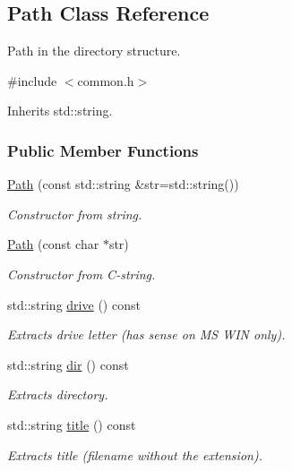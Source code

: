 \hypertarget{classPath}{
\subsection{Path Class Reference}
\label{classPath}
}


Path in the directory structure.  




{\ttfamily \#include $<$common.h$>$}



Inherits std::string.

\subsubsection*{Public Member Functions}
\begin{DoxyCompactItemize}
\item 
\hyperlink{classPath_ad74027d0529d7dc86303fa6dbee897ed}{Path} (const std::string \&str=std::string())
\begin{DoxyCompactList}\small\item\em Constructor from string. \item\end{DoxyCompactList}\item 
\hyperlink{classPath_a21dd91a2ef28ac356b59b5be122fb664}{Path} (const char $\ast$str)
\begin{DoxyCompactList}\small\item\em Constructor from C-\/string. \item\end{DoxyCompactList}\item 
std::string \hyperlink{classPath_a72f40a492c7e64723302c589a8f1f334}{drive} () const 
\begin{DoxyCompactList}\small\item\em Extracts drive letter (has sense on MS WIN only). \item\end{DoxyCompactList}\item 
std::string \hyperlink{classPath_abf4affad000c6baa4fe2f573d0ce395f}{dir} () const 
\begin{DoxyCompactList}\small\item\em Extracts directory. \item\end{DoxyCompactList}\item 
std::string \hyperlink{classPath_ac93ac36524119932f248f70329213d31}{title} () const 
\begin{DoxyCompactList}\small\item\em Extracts title (filename without the extension). \item\end{DoxyCompactList}\item 

\end{DoxyCompactItemize}
